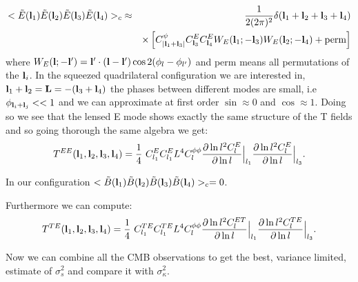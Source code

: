 \documentclass[prd,onecolumn,amsmath,amssymb,floatfix,superscriptaddress,notitlepage]{revtex4-1}
\def\ba{\begin{eqnarray}}
\def\ea{\end{eqnarray}}
\newcommand{\bl}{{\bf l}}
\newcommand{\bL}{{\bf L}}
\begin{document}
\ba
<\tilde E(\bl_{1})\tilde E(\bl_{2})\tilde E(\bl_{3})\tilde E(\bl_{4})>_{c}&\approx& \frac{1}{2(2\pi)^{2}}\delta(\bl_{1}+\bl_{2}+\bl_{3}+\bl_{4})\\
&& \times \left[ C^{\psi}_{|\bl_{1}+\bl_{3}|}C^{E}_{\bl_{3}}C^{E}_{\bl_{4}}W_{E}(\bl_{1};-\bl_{3})W_{E}(\bl_{2};-\bl_{4})+\text{perm}\right]
\ea
where $W_{E}(\bl;-\bl')=\bl' \cdot (\bl -\bl') \cos 2(\phi_{l} - \phi_{l'})$ and perm means all permutations of the $\bl_{i}$. In the squeezed quadrilateral configuration we are interested in, $\bl_{1}+\bl_{2}=\bL=-(\bl_{3}+\bl_{4})$ the phases between different modes are small, i.e $\phi_{\bl_{i}+\bl_{j}}<<1$ and we can approximate at first order $\sin\approx0$ and $\cos\approx1$. Doing so we see that the lensed E mode shows exactly the same structure of the T fields and so going thorough the same algebra we get:
\ba
T^{EE}(\bl_{1},\bl_{2},\bl_{3},\bl_{4}) = \frac14~C^{E}_{l_{1}}C^{E}_{l_{1}}L^{4} C^{\phi\phi}_{l} \frac{\partial \ln l^{2}C^{E}_{l}}{\partial\ln l}\Big|_{l_1} \frac{\partial \ln l^{2}C^{E}_{l}}{\partial\ln l}\Big|_{l_3}.
\ea

In our configuration $<\tilde B(\bl_{1})\tilde B(\bl_{2})\tilde B(\bl_{3})\tilde B(\bl_{4})>_{c}=0$.

Furthermore we can compute:
\ba
T^{TE}(\bl_{1},\bl_{2},\bl_{3},\bl_{4}) = \frac14~C^{TE}_{l_{1}}C^{TE}_{l_{1}}L^{4} C^{\phi\phi}_{l} \frac{\partial \ln l^{2}C^{ET}_{l}}{\partial\ln l}\Big|_{l_1} \frac{\partial \ln l^{2}C^{TE}_{l}}{\partial\ln l}\Big|_{l_3}.
\ea

Now we can combine all the CMB observations to get the best, variance limited, estimate of $\sigma_{s}^{2}$ and compare it with $\sigma_{\kappa}^{2}$.
\end{document}
